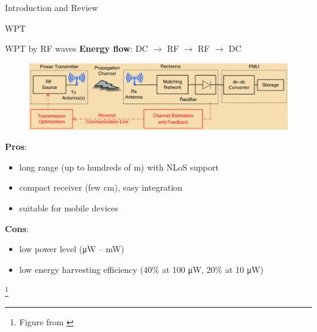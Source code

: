 \documentclass[9pt]{beamer}
\newcommand\blfootnote[1]{%
\begingroup
\renewcommand\thefootnote{}\footnote{#1}%
\addtocounter{footnote}{-1}%
\endgroup
}
\begin{document}
\begin{section}{Introduction and Review}
\begin{subsection}{WPT}
		\begin{frame}{WPT by RF waves}
			\textbf{Energy flow}: DC $\to$ RF $\to$ RF $\to$ DC
			\begin{figure}
				\centering
				\includegraphics[width=\textwidth]{assets/wpt.eps}
			\end{figure}
			\textbf{Pros}:
			\begin{itemize}
				\item long range (up to hundreds of \si{\m}) with NLoS support
				\item compact receiver (few \si{\cm}), easy integration
				\item suitable for mobile devices
			\end{itemize}
			\textbf{Cons}:
			\begin{itemize}
				\item low power level (\si{\uW} -- \si{\mW})
				\item low energy harvesting efficiency (40\% at 100 \si{\uW}, 20\% at 10 \si{\uW})
			\end{itemize}
			\blfootnote{Figure from \cite{Clerckx2018a}}
		\end{frame}
	\end{subsection}


\end{section}
\end{document}
